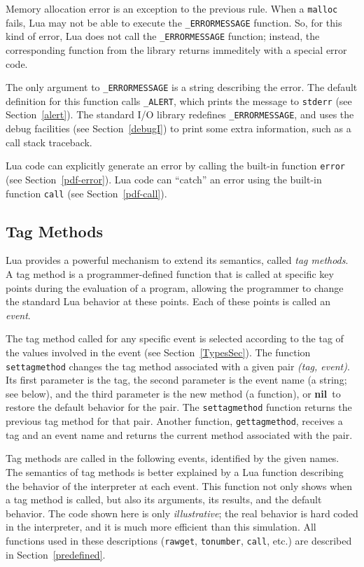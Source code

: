 \documentclass[11pt]{article}
\newcommand{\See}[1]{Section~\ref{#1}}
\newcommand{\see}[1]{(see \See{#1})}
\newcommand{\M}[1]{\rm\emph{#1}}
\newcommand{\T}[1]{{\tt #1}}
\newcommand{\nil}{{\bf nil}}
\newcommand{\IndexVerb}[1]{\T{#1}\index{#1}}
\newcommand{\Def}[1]{\emph{#1}\index{#1}}
\newcommand{\Deffunc}[1]{\index{#1}}
\begin{document}
Memory allocation error is an exception to the previous rule.
When a \verb|malloc| fails, Lua may not be able to execute the
\verb|_ERRORMESSAGE| function.
So, for this kind of error, Lua does not call
the \verb|_ERRORMESSAGE| function;
instead, the corresponding function from the library
returns immeditely with a special error code.

The only argument to \verb|_ERRORMESSAGE| is a string
describing the error.
The default definition for
this function calls \verb|_ALERT|, \Deffunc{_ALERT}
which prints the message to \verb|stderr| \see{alert}.
The standard I/O library redefines \verb|_ERRORMESSAGE|,
and uses the debug facilities \see{debugI}
to print some extra information,
such as a call stack traceback.

Lua code can explicitly generate an error by calling the built-in
function \verb|error| \see{pdf-error}.
Lua code can ``catch'' an error using the built-in function
\verb|call| \see{pdf-call}.


\subsection{Tag Methods} \label{tag-method}

Lua provides a powerful mechanism to extend its semantics,
called \Def{tag methods}.
A tag method is a programmer-defined function
that is called at specific key points during the evaluation of a program,
allowing the programmer to change the standard Lua behavior at these points.
Each of these points is called an \Def{event}.

The tag method called for any specific event is selected
according to the tag of the values involved
in the event \see{TypesSec}.
The function \IndexVerb{settagmethod} changes the tag method
associated with a given pair \M{(tag, event)}.
Its first parameter is the tag, the second parameter is the event name
(a string; see below),
and the third parameter is the new method (a function),
or \nil\ to restore the default behavior for the pair.
The \verb|settagmethod| function returns the previous tag method for that pair.
Another function, \IndexVerb{gettagmethod},
receives a tag and an event name and returns the
current method associated with the pair.

Tag methods are called in the following events,
identified by the given names.
The semantics of tag methods is better explained by a Lua function
describing the behavior of the interpreter at each event.
This function not only shows when a tag method is called,
but also its arguments, its results, and the default behavior.
The code shown here is only \emph{illustrative};
the real behavior is hard coded in the interpreter,
and it is much more efficient than this simulation.
All functions used in these descriptions
(\verb|rawget|, \verb|tonumber|, \verb|call|, etc.)
are described in \See{predefined}.
\end{document}
